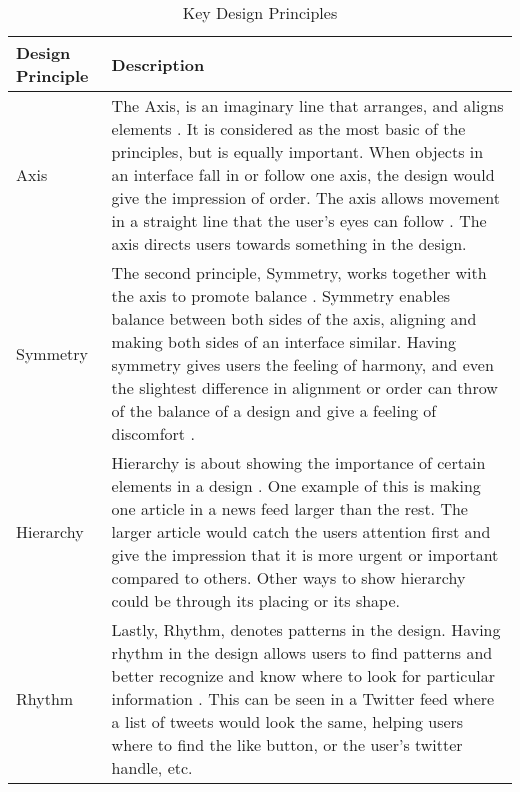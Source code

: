         \begin{longtable}{|p{2cm}|p{11.6cm}|} 
        \caption{Key Design Principles} \label{tab:key-design-principles} \\
        \hline
        
        	Design Principle & Description \\ \hline
            
            Axis & The Axis, is an imaginary line that arranges, and aligns elements \citep{mandelbaum2014design}. It is considered as the most basic of the principles, but is equally important. When objects in an interface fall in or follow one axis, the design would give the impression of order. The axis allows movement in a straight line that the user's eyes can follow \citep{mandelbaum2014design}. The axis directs users towards something in the design. \\ \hline
        
        	Symmetry & The second principle, Symmetry, works together with the axis to promote balance \citep{mandelbaum2014design}. Symmetry enables balance between both sides of the axis, aligning and making both sides of an interface similar. Having symmetry gives users the feeling of harmony, and even the slightest difference in alignment or order can throw of the balance of a design and give a feeling of discomfort \citep{mandelbaum2014design}. \\ \hline
        
        	Hierarchy & Hierarchy is about showing the importance of certain elements in a design \citep{mandelbaum2014design}. One example of this is making one article in a news feed larger than the rest. The larger article would catch the users attention first and give the impression that it is more urgent or important compared to others. Other ways to show hierarchy could be through its placing or its shape. \\ \hline
        
        	Rhythm & Lastly, Rhythm, denotes patterns in the design. Having rhythm in the design allows users to find patterns and better recognize and know where to look for particular information \citep{mandelbaum2014design}. This can be seen in a Twitter feed where a list of tweets would look the same, helping users where to find the like button, or the user's twitter handle, etc. \\ \hline
           
        \end{longtable}
        

